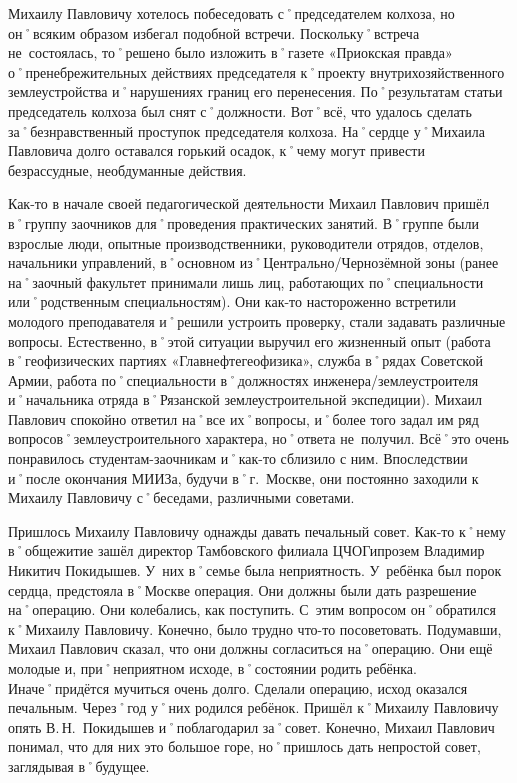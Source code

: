 Михаилу Павловичу хотелось побеседовать с˚председателем колхоза, но он˚всяким образом избегал подобной встречи. Поскольку˚встреча не~состоялась, то˚решено было изложить в˚газете «Приокская правда» о˚пренебрежительных действиях председателя к˚проекту внутрихозяйственного землеустройства и˚нарушениях границ его перенесения. По˚результатам статьи председатель колхоза был снят с˚должности. Вот˚всё, что удалось сделать за˚безнравственный проступок председателя колхоза. На˚сердце у˚Михаила Павловича долго оставался горький осадок, к˚чему могут привести безрассудные, необдуманные действия.

Как-то в начале своей педагогической деятельности Михаил Павлович пришёл в˚группу заочников для˚проведения практических занятий. В˚группе были взрослые люди, опытные производственники, руководители отрядов, отделов, начальники управлений, в˚основном из˚Центрально\-/Чернозёмной зоны (ранее на˚заочный факультет принимали лишь лиц, работающих по˚специальности или˚родственным специальностям). Они как-то настороженно встретили  молодого преподавателя и˚решили устроить проверку, стали задавать различные вопросы. Естественно, в˚этой ситуации выручил его жизненный опыт (работа в˚геофизических партиях «Главнефтегеофизика», служба в˚рядах Советской Армии, работа по˚специальности в˚должностях инженера\-/землеустроителя и˚начальника отряда в˚Рязанской землеустроительной экспедиции). Михаил Павлович спокойно ответил на˚все их˚вопросы, и˚более того задал им ряд вопросов˚землеустроительного характера, но˚ответа не~получил. Всё˚это очень понравилось студентам-заочникам и˚как-то сблизило с ним. Впоследствии и˚после окончания \mbox{МИИЗа}, будучи в˚г.~Москве, они постоянно заходили к Михаилу Павловичу с˚беседами, различными советами. 
\enlargethispage{\baselineskip}		%
\pagebreak												%

Пришлось Михаилу Павловичу однажды давать печальный совет. Как-то к˚нему в˚общежитие зашёл директор Тамбовского филиала ЦЧОГипрозем Владимир Никитич Покидышев. У~них в˚семье была неприятность. У~ребёнка был порок сердца, предстояла в˚Москве операция. Они должны были дать разрешение на˚операцию. Они колебались, как поступить. С~этим вопросом он˚обратился к˚Михаилу Павловичу. Конечно, было трудно что-то посоветовать. Подумавши, Михаил Павлович сказал, что они должны согласиться на˚операцию. Они ещё молодые и, при˚неприятном исходе, в˚состоянии родить ребёнка. Иначе˚придётся мучиться очень долго. Сделали операцию, исход оказался печальным. Через˚год у˚них родился ребёнок. Пришёл к˚Михаилу Павловичу опять В.\,Н.~Покидышев и˚поблагодарил за˚совет. Конечно, Михаил Павлович понимал, что для них это большое горе, но˚пришлось дать непростой совет, заглядывая в˚будущее.

